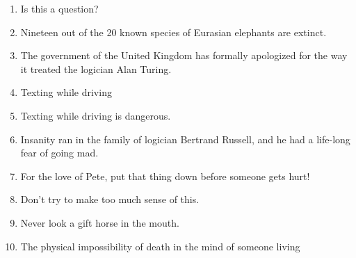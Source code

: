 \begin{enumerate}
\item Is this a question? %
\item Nineteen out of the 20 known species of Eurasian elephants are extinct. %
\item The government of the United Kingdom has formally apologized for the way it treated the logician Alan Turing. %

\item Texting while driving %
\item Texting while driving is dangerous. %
\item Insanity ran in the family of logician Bertrand Russell, and he had a life-long fear of going mad. %
\item For the love of Pete, put that thing down before someone gets hurt!  %
\item Don't try to make too much sense of this. %
\item Never look a gift horse in the mouth.  %
\item The physical impossibility of death in the mind of someone living  %
\end{enumerate}




